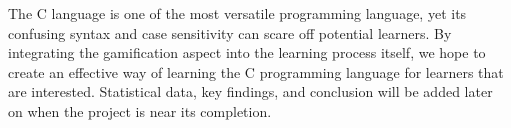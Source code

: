 The C language is one of the most versatile programming language, yet its confusing syntax and case sensitivity can scare off potential learners. By integrating the gamification aspect into the learning process itself, we hope to create an effective way of learning the C programming language for learners that are interested. Statistical data, key findings, and conclusion will be added later on when the project is near its completion.
